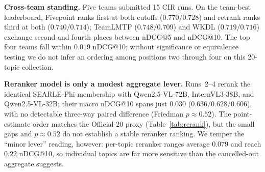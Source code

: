 \documentclass[sigconf,nonacm]{acmart}
\begin{document}
\begin{table}[t]
\centering\small
\caption{Our five submitted runs on the 20 official CIR topics (pooled human
judgments). Stage-1 pool is content-verified by candidate-set matching.
Runs~2--4 share a byte-identical SEARLE-Phi candidate membership (identical
per-topic relevance-label vectors in the released counts), so their score
differences come purely from reranker ordering.}
\label{tab:official}
\end{table}

\textbf{Cross-team standing.} Five teams submitted 15 CIR runs. On the
team-best leaderboard, Fivepoint ranks first at both cutoffs ($0.770/0.728$)
and retrank ranks third at both ($0.740/0.714$); TeamLMTP ($0.748/0.709$) and
WKDL ($0.719/0.716$) exchange second and fourth places between nDCG@5 and
nDCG@10. The top four teams fall within $0.019$ nDCG@10; without significance
or equivalence testing we do not infer an ordering among positions two through
four on this 20-topic collection.

\textbf{Reranker model is only a modest aggregate lever.} Runs~2--4 rerank the
identical SEARLE-Phi membership with Qwen2.5-VL-72B, InternVL3-38B, and
Qwen2.5-VL-32B; their macro nDCG@10 spans just $0.030$ ($0.636/0.628/0.606$),
with no detectable three-way paired difference (Friedman $p\approx0.52$). The
point-estimate order matches the Official-20 proxy (Table~\ref{tab:rerank}),
but the small gaps and $p\approx0.52$ do not establish a stable reranker
ranking. We temper the
``minor lever'' reading, however: per-topic reranker ranges average $0.079$ and
reach $0.22$ nDCG@10, so individual topics are far more sensitive than the
cancelled-out aggregate suggests.
\end{document}

